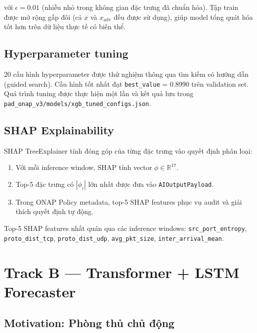 \documentclass[12pt,a4paper]{article}
\begin{document}
với $\epsilon = 0.01$ (nhiễu nhỏ trong không gian đặc trưng đã chuẩn hóa). Tập train được mở rộng gấp đôi (cả $x$ và $x_{\text{adv}}$ đều được sử dụng), giúp model tổng quát hóa tốt hơn trên dữ liệu thực tế có biến thể.

\subsection{Hyperparameter tuning}

20 cấu hình hyperparameter được thử nghiệm thông qua tìm kiếm có hướng dẫn (guided search). Cấu hình tốt nhất đạt \texttt{best\_value} = 0.8990 trên validation set. Quá trình tuning được thực hiện một lần và kết quả lưu trong \texttt{pad\_onap\_v3/models/xgb\_tuned\_configs.json}.

\subsection{SHAP Explainability}

SHAP TreeExplainer \cite{lundberg2017unified} tính đóng góp của từng đặc trưng vào quyết định phân loại:

\begin{enumerate}[leftmargin=2em]
\item Với mỗi inference window, SHAP tính vector $\phi \in \mathbb{R}^{17}$.
\item Top-5 đặc trưng có $|\phi_i|$ lớn nhất được đưa vào \texttt{AIOutputPayload}.
\item Trong ONAP Policy metadata, top-5 SHAP features phục vụ audit và giải thích quyết định tự động.
\end{enumerate}

Top-5 SHAP features nhất quán qua các inference windows: \texttt{src\_port\_entropy}, \texttt{proto\_dist\_tcp}, \texttt{proto\_dist\_udp}, \texttt{avg\_pkt\_size}, \texttt{inter\_arrival\_mean}.

\section{Track B --- Transformer + LSTM Forecaster}

\subsection{Motivation: Phòng thủ chủ động}
\end{document}
